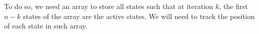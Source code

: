 \documentclass[acmsmall,screen,anonymous]{acmart}
\begin{document}
To do so, we need an array to store all states such that at iteration $k$, the first $n-k$ states of the array are the active states. We will need to track the position of each state in such array.
\end{document}
